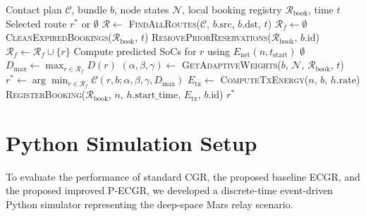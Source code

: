 \documentclass[a4paper,fleqn]{cas-dc}
\newcommand{\ecgr}{\textsf{ECGR}}
\newcommand{\pecgr}{\textsf{P-ECGR}}
\begin{document}
\begin{algorithm}[t]
\caption{\pecgr{} Route Selection and Energy Booking}
\label{alg:pecgr}
\begin{algorithmic}[1]
\REQUIRE Contact plan $\mathcal{C}$, bundle $b$, node states $\mathcal{N}$, local booking registry $\mathcal{R}_{\text{book}}$, time $t$
\ENSURE Selected route $r^*$ or $\emptyset$
\STATE $\mathcal{R} \leftarrow$ \textsc{FindAllRoutes}($\mathcal{C}$, $b.\text{src}$, $b.\text{dst}$, $t$)
\STATE $\mathcal{R}_f \leftarrow \emptyset$
\STATE \textsc{CleanExpiredBookings}($\mathcal{R}_{\text{book}}$, $t$)
\STATE \textsc{RemovePriorReservations}($\mathcal{R}_{\text{book}}$, $b.\text{id}$)
        \STATE $\mathcal{R}_f \leftarrow \mathcal{R}_f \cup \{r\}$
        \STATE Compute predicted SoCs for $r$ using $E_{\text{net}}(n, t_{\text{start}})$
    \ENDIF
\ENDFOR
{}
    \RETURN $\emptyset$
\ENDIF
\STATE $D_{\max} \leftarrow \max_{r \in \mathcal{R}_f} D(r)$
\STATE $(\alpha, \beta, \gamma) \leftarrow$ \textsc{GetAdaptiveWeights}($b$, $\mathcal{N}$, $\mathcal{R}_{\text{book}}$, $t$)
\STATE $r^* \leftarrow \arg\min_{r \in \mathcal{R}_f} \mathcal{C}(r, b; \alpha, \beta, \gamma, D_{\max})$
        \STATE $E_{\text{tx}} \leftarrow$ \textsc{ComputeTxEnergy}($n$, $b$, $h.\text{rate}$)
        \STATE \textsc{RegisterBooking}($\mathcal{R}_{\text{book}}$, $n$, $h.\text{start\_time}$, $E_{\text{tx}}$, $b.\text{id}$)
    \ENDFOR
\ENDIF
\RETURN $r^*$
\end{algorithmic}
\end{algorithm}

\section{Python Simulation Setup}
\label{sec:setup}

To evaluate the performance of standard CGR, the proposed baseline \ecgr{}, and the proposed improved \pecgr{}, we developed a discrete-time event-driven Python simulator representing the deep-space Mars relay scenario.
\end{document}
